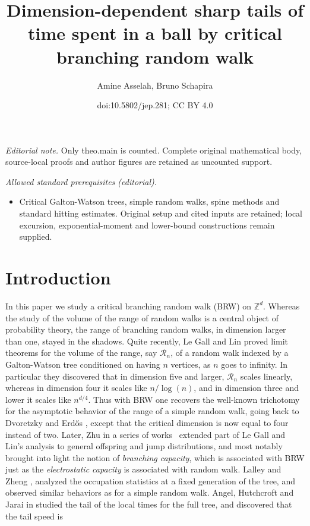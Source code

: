 \documentclass[11pt]{article}
\title{Dimension-dependent sharp tails of time spent in a ball by critical branching random walk}
\author{Amine Asselah, Bruno Schapira}
\date{doi:10.5802/jep.281; CC BY 4.0}
\numberwithin{equation}{section}
\theoremstyle{plain}
\theoremstyle{definition}
\newcommand\Z{\mathbb{Z}}
\newcommand{\1}{{\text{\Large $\mathfrak 1$}}}
\begin{document}
\maketitle
\noindent\textit{Editorial note.} Only theo.main is counted. Complete original mathematical body, source-local proofs and author figures are retained as uncounted support.\par\medskip
\noindent\textit{Allowed standard prerequisites (editorial).}\begin{itemize}
\item Critical Galton-Watson trees, simple random walks, spine methods and standard hitting estimates. Original setup and cited inputs are retained; local excursion, exponential-moment and lower-bound constructions remain supplied.
\end{itemize}\medskip
\section{Introduction}\label{sec-intro}
In this paper we study a critical branching random walk (BRW) on $\Z^d$.
Whereas the study of the volume of the range of random walks is a central
object of probability theory, the range of branching random walks,
in dimension larger than one, stayed in the shadows.
Quite recently, Le Gall and Lin \cite{LGL1,LGL2} proved limit theorems
for the volume of the range, say $\mathcal R_n$, of a random walk indexed by a Galton-Watson tree
conditioned on having $n$ vertices, as $n$ goes
to infinity.
In particular they discovered that in dimension five and larger,
$\mathcal R_n$
scales linearly, whereas in dimension four it scales like
$n/\log(n)$, and in dimension three and lower it scales
like $n^{d/4}$. Thus with BRW one recovers the well-known trichotomy for the asymptotic behavior of the range
of a simple random walk, going back to Dvoretzky and Erd\H{o}s \cite{DE}, except that
the critical dimension is now equal to four instead of two.
Later, Zhu in a series of works~\cite{Zhu1,Zhu2,Zhu4,Zhu3} extended part of Le Gall and Lin's analysis to general offspring and jump distributions,
and most notably brought into light
the notion of {\it branching capacity}, which is associated with
BRW just as the {\it electrostatic capacity}
is associated with random walk.
Lalley and Zheng \cite{LZ11},
analyzed the occupation statistics at a fixed generation of the tree,
and observed similar behaviors as for a simple random walk.
Angel, Hutchcroft and Jarai in \cite{AHJ}
studied the tail of the local times for the full tree, and
discovered that the tail speed is
\end{document}
